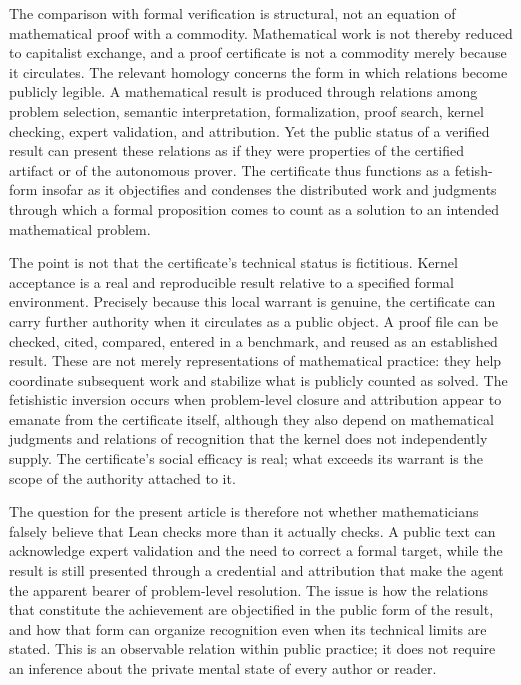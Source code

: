 \documentclass[pdflatex,sn-apa]{sn-jnl}
\begin{document}
The comparison with formal verification is structural, not an equation of mathematical proof with a commodity. Mathematical work is not thereby reduced to capitalist exchange, and a proof certificate is not a commodity merely because it circulates. The relevant homology concerns the form in which relations become publicly legible. A mathematical result is produced through relations among problem selection, semantic interpretation, formalization, proof search, kernel checking, expert validation, and attribution. Yet the public status of a verified result can present these relations as if they were properties of the certified artifact or of the autonomous prover. The certificate thus functions as a fetish-form insofar as it objectifies and condenses the distributed work and judgments through which a formal proposition comes to count as a solution to an intended mathematical problem.

The point is not that the certificate's technical status is fictitious. Kernel acceptance is a real and reproducible result relative to a specified formal environment. Precisely because this local warrant is genuine, the certificate can carry further authority when it circulates as a public object. A proof file can be checked, cited, compared, entered in a benchmark, and reused as an established result. These are not merely representations of mathematical practice: they help coordinate subsequent work and stabilize what is publicly counted as solved. The fetishistic inversion occurs when problem-level closure and attribution appear to emanate from the certificate itself, although they also depend on mathematical judgments and relations of recognition that the kernel does not independently supply. The certificate's social efficacy is real; what exceeds its warrant is the scope of the authority attached to it.

The question for the present article is therefore not whether mathematicians falsely believe that Lean checks more than it actually checks. A public text can acknowledge expert validation and the need to correct a formal target, while the result is still presented through a credential and attribution that make the agent the apparent bearer of problem-level resolution. The issue is how the relations that constitute the achievement are objectified in the public form of the result, and how that form can organize recognition even when its technical limits are stated. This is an observable relation within public practice; it does not require an inference about the private mental state of every author or reader.
\end{document}
